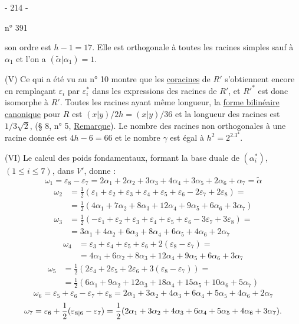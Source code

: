 \begin{center}- 214 -\end{center}
\hfill n° 391

son ordre est $h-1=17$. Elle est orthogonale à toutes les racines simples sauf à $\alpha_1$ et l'on a $(\widetilde\alpha|\alpha_1)=1$.

(V) Ce qui a été vu au n° 10 montre que les \uline{coracines} de $R'$ s'obtiennent encore en remplaçant $\varepsilon_i$ par $\varepsilon_i^*$ dans les expressions des racines de $R'$, et $R'^*$ est donc isomorphe à $R'$. Toutes les racines ayant même longueur, la \uline{forme bilinéaire canonique} pour $R$ est $(x|y)/2h=(x|y)/36$ et la longueur des racines est $1/3\sqrt2$, (§ 8, n° 5, \uline{Remarque}). Le nombre des racines non orthogonales à une racine donnée est $4h-6=66$ et le nombre $\gamma$ est égal à $h^2=2^2.3^4$.

(VI) Le calcul des poids fondamentaux, formant la base duale de $(\alpha_i^*)$, $(1\leq i\leq7)$, dans $V'$, donne :
\[
\omega_1=\varepsilon_8-\varepsilon_7=2\alpha_1+2\alpha_2+3\alpha_3+4\alpha_4+3\alpha_5+2\alpha_6+\alpha_7=\widetilde\alpha
\]
\[
\begin{split}
\omega_2&=\frac12(\varepsilon_1+\varepsilon_2+\varepsilon_3+\varepsilon_4+\varepsilon_5+\varepsilon_6-2\varepsilon_7+2\varepsilon_8)=\\
&=\frac12(4\alpha_1+7\alpha_2+8\alpha_3+12\alpha_4+9\alpha_5+6\alpha_6+3\alpha_7)
\end{split}
\]
\[
\begin{split}
\omega_3&=\frac12(-\varepsilon_1+\varepsilon_2+\varepsilon_3+\varepsilon_4+\varepsilon_5+\varepsilon_6-3\varepsilon_7+3\varepsilon_8)=\\
&=3\alpha_1+4\alpha_2+6\alpha_3+8\alpha_4+6\alpha_5+4\alpha_6+2\alpha_7
\end{split}
\]
\[
\begin{split}
\omega_4&=\varepsilon_3+\varepsilon_4+\varepsilon_5+\varepsilon_6+2(\varepsilon_8-\varepsilon_7)=\\
&=4\alpha_1+6\alpha_2+8\alpha_3+12\alpha_4+9\alpha_5+6\alpha_6+3\alpha_7
\end{split}
\]
\[
\begin{split}
\omega_5&=\frac12(2\varepsilon_4+2\varepsilon_5+2\varepsilon_6+3(\varepsilon_8-\varepsilon_7))=\\
&=\frac12(6\alpha_1+9\alpha_2+12\alpha_3+18\alpha_4+15\alpha_5+10\alpha_6+5\alpha_7)
\end{split}
\]
\[
\omega_6=\varepsilon_5+\varepsilon_6-\varepsilon_7+\varepsilon_8=2\alpha_1+3\alpha_2+4\alpha_3+6\alpha_4+5\alpha_5+4\alpha_6+2\alpha_7
\]
\[
\omega_7=\varepsilon_6+\frac12(\varepsilon_{\relax{8|6}}-\varepsilon_7)=\frac12(2\alpha_1+3\alpha_2+4\alpha_3+6\alpha_4+5\alpha_5+4\alpha_6+3\alpha_7).
\]

